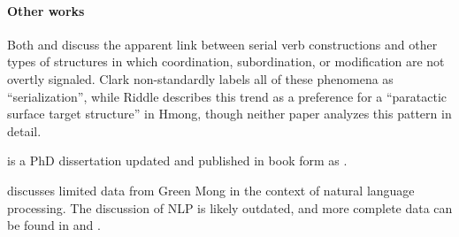 \documentclass[11pt]{scrartcl}
\newcommand{\myrule}{\rule{.50\pagewidth}{.4pt}}
\newenvironment{commoncore}%
	{	\vspace{-0.5\baselineskip}%
		\begin{center}%
		\begin{minipage}{.88\linewidth}%
		\KOMAoptions{parskip=half}%
		}
	{	\end{minipage}\medskip\par%
		\end{center}%
		}
\newenvironment{otherworks}%
	{	\paragraph{Other works}%
		\begin{commoncore}%
		}
	{	\par%
		\end{commoncore}%
		}%
\newcommand{\rlink}[1]{\hyperref[#1]{\citealt{#1}}}%
\begin{document}
\begin{otherworks}
Both \citet{Fuller1990} and \citet{Clark1992b} discuss the apparent link between serial verb constructions and other types of structures in which coordination, subordination, or modification are not overtly signaled. Clark non-standardly labels all of these phenomena as ``serialization'', while Riddle describes this trend as a preference for a ``paratactic surface target structure'' in Hmong, though neither paper analyzes this pattern in detail. 

	
\citealt{Jarkey1991} is a PhD dissertation updated and published in book form as \rlink{Jarkey2015}.
	
\citet{Harriehausen-Muhlbauer1992} discusses limited data from Green Mong in the context of natural language processing. The discussion of NLP is likely outdated, and more complete data can be found in \rlink{Jarkey2010} and \rlink{Jarkey2015}.

\end{otherworks}

\end{document}
